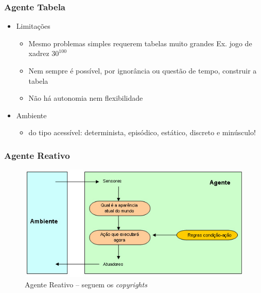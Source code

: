 
\begin{frame} %

    \frametitle{Agente Tabela}

\begin{itemize}
  \item Limitações
  \begin{itemize}
    \item Mesmo problemas simples requerem tabelas muito grandes 
Ex. jogo de xadrez $30^{100}$
    \item Nem sempre é possível, por ignorância ou questão de tempo, construir a tabela 
    \item  Não há autonomia nem flexibilidade
  \end{itemize}
  
  \item Ambiente
\begin{itemize}
  \item do tipo acessível:  determinista, episódico, 
   estático, discreto e minúsculo!
   
\end{itemize}
  
\end{itemize}
\end{frame}



\begin{frame} %

\frametitle{Agente Reativo}

\begin{figure}[!ht]
  \centering
  \includegraphics[height =.6\textheight,width=.7\textwidth]
  {figuras/agente_reativo.jpg}
  \caption{Agente Reativo -- seguem os \textit{copyrights}}
\end{figure}

\end{frame}



